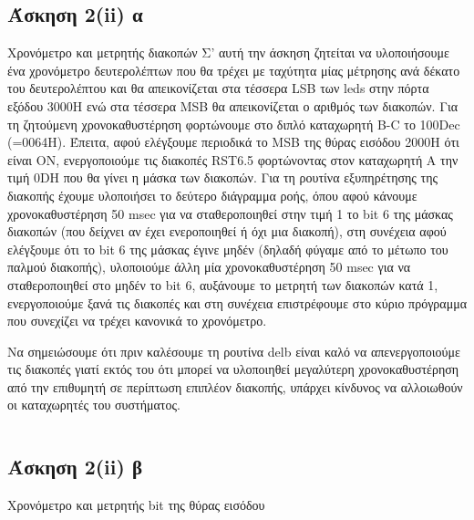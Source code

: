 \documentclass[a4paper,10pt]{article} \usepackage{anysize}
\begin{document}
\subsection*{Άσκηση 2(ii) α}
Χρονόμετρο και μετρητής διακοπών
Σ' αυτή την άσκηση ζητείται να υλοποιήσουμε ένα χρονόμετρο δευτερολέπτων
που θα τρέχει με ταχύτητα μίας μέτρησης ανά δέκατο του δευτερολέπτου και θα
απεικονίζεται στα τέσσερα LSB των leds στην πόρτα εξόδου 3000H ενώ στα τέσσερα
MSB θα απεικονίζεται ο αριθμός των διακοπών. Για τη ζητούμενη χρονοκαθυστέρηση
φορτώνουμε στο διπλό  καταχωρητή B-C το 100Dec (=0064H). Έπειτα, αφού
ελέγξουμε περιοδικά το MSB της θύρας εισόδου 2000Η  ότι είναι ΟΝ,
ενεργοποιούμε τις διακοπές RST6.5 φορτώνοντας στον καταχωρητή Α την τιμή 0DH
που θα γίνει η μάσκα των διακοπών. Για τη ρουτίνα εξυπηρέτησης της διακοπής
έχουμε υλοποιήσει το δεύτερο διάγραμμα ροής, όπου αφού κάνουμε
χρονοκαθυστέρηση 50 msec για να σταθεροποιηθεί στην τιμή 1 το bit 6 της μάσκας
διακοπών (που δείχνει αν έχει ενεροποιηθεί ή όχι μια διακοπή), στη συνέχεια
αφού ελέγξουμε ότι το bit 6 της μάσκας έγινε μηδέν (δηλαδή φύγαμε από το
μέτωπο του παλμού διακοπής), υλοποιούμε άλλη μία χρονοκαθυστέρηση 50 msec για
να σταθεροποιηθεί στο μηδέν το bit 6, αυξάνουμε το μετρητή των διακοπών κατά
1, ενεργοποιούμε ξανά τις διακοπές και στη συνέχεια επιστρέφουμε στο κύριο
πρόγραμμα που συνεχίζει να τρέχει κανονικά το χρονόμετρο.

Να σημειώσουμε ότι πριν καλέσουμε τη ρουτίνα delb είναι καλό να
απενεργοποιούμε τις διακοπές γιατί εκτός του ότι μπορεί να υλοποιηθεί
μεγαλύτερη χρονοκαθυστέρηση από την επιθυμητή σε περίπτωση επιπλέον διακοπής,
υπάρχει κίνδυνος να αλλοιωθούν οι καταχωρητές του συστήματος.
\inputminted[linenos,obeytabs,fontsize=\footnotesize]{oldasm}{../askhsh_2_ii_a.8085}
\subsection*{Άσκηση 2(ii) β}
Χρονόμετρο και μετρητής bit της θύρας εισόδου
\inputminted[linenos,obeytabs,fontsize=\footnotesize]{oldasm}{../askhsh_2_ii_b.8085}
\end{document}

